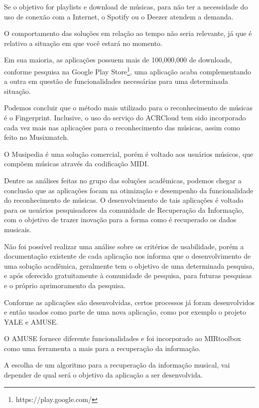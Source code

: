 Se o objetivo for playlists e download de músicas, para não ter a necessidade do uso de conexão com a Internet, o Spotify ou o Deezer atendem a demanda.

O comportamento das soluções em relação ao tempo não seria relevante, já que é relativo a situação em que você estará no momento.

Em sua maioria, as aplicações possuem mais de 100,000,000 de downloads, conforme pesquisa na Google Play Store\footnote{https://play.google.com/}, uma aplicação acaba complementando a outra em questão de funcionalidades necessárias para uma determinada situação.

Podemos concluir que o método mais utilizado para o reconhecimento de músicas é o Fingerprint. Inclusive, o uso do serviço do ACRCloud tem sido incorporado cada vez mais nas aplicações para o reconhecimento das músicas, assim como feito no Musixmatch.

O Musipedia é uma solução comercial, porém é voltado aos usuários músicos, que compõem músicas através da codificação MIDI.

Dentre as análises feitas no grupo das soluções acadêmicas, podemos chegar a conclusão que as aplicações focam na otimização e desempenho da funcionalidade do reconhecimento de músicas. O desenvolvimento de tais aplicações é voltado para os usuários pesquisadores da comunidade de Recuperação da Informação, com o objetivo de trazer inovação para a forma como é recuperado os dados musicais.

Não foi possível realizar uma análise sobre os critérios de usabilidade, porém a documentação existente de cada aplicação nos informa que o desenvolvimento de uma solução acadêmica, geralmente tem o objetivo de uma determinada pesquisa, e após oferecido gratuitamente à comunidade de pesquisa, para futuras pesquisas e o próprio aprimoramento da pesquisa.

Conforme as aplicações são desenvolvidas, certos processos já foram desenvolvidos e então usados como parte de uma nova aplicação, como por exemplo o projeto YALE e AMUSE. 

O AMUSE fornece diferente funcionalidades e foi incorporado ao MIRtoolbox como uma ferramenta a mais para a recuperação da informação.

A escolha de um algoritmo para a recuperação da informação musical, vai depender de qual será o objetivo da aplicação a ser desenvolvida.